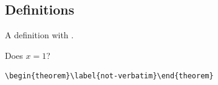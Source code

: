 \subsection{Definitions}
\begin{definition}\label{def:fixture}A definition with .\end{definition}
\begin{question}Does $x=1$?\end{question}
\begin{verbatim}
\begin{theorem}\label{not-verbatim}\end{theorem}
\end{verbatim}

